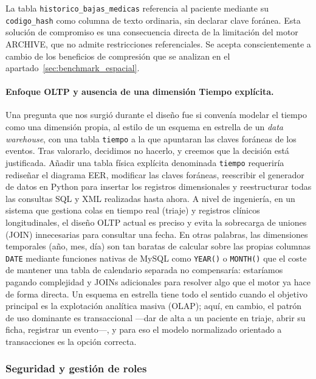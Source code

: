 \documentclass[../main.tex]{subfiles}
\begin{document}
La tabla \texttt{historico\_bajas\_medicas} referencia al paciente mediante su \texttt{codigo\_hash} como columna de texto ordinaria, sin declarar clave foránea. Esta solución de compromiso es una consecuencia directa de la limitación del motor ARCHIVE, que no admite restricciones referenciales. Se acepta conscientemente a cambio de los beneficios de compresión que se analizan en el apartado~\ref{sec:benchmark_espacial}.

\paragraph{Enfoque OLTP y ausencia de una dimensión Tiempo explícita.}

Una pregunta que nos surgió durante el diseño fue si convenía modelar el tiempo como una dimensión propia, al estilo de un esquema en estrella de un \textit{data warehouse}, con una tabla \texttt{tiempo} a la que apuntaran las claves foráneas de los eventos. Tras valorarlo, decidimos no hacerlo, y creemos que la decisión está justificada. Añadir una tabla física explícita denominada \texttt{tiempo} requeriría rediseñar el diagrama EER, modificar las claves foráneas, reescribir el generador de datos en Python para insertar los registros dimensionales y reestructurar todas las consultas SQL y XML realizadas hasta ahora. A nivel de ingeniería, en un sistema que gestiona colas en tiempo real (triaje) y registros clínicos longitudinales, el diseño OLTP actual es preciso y evita la sobrecarga de uniones (JOIN) innecesarias para consultar una fecha. En otras palabras, las dimensiones temporales (año, mes, día) son tan baratas de calcular sobre las propias columnas \texttt{DATE} mediante funciones nativas de MySQL como \texttt{YEAR()} o \texttt{MONTH()} que el coste de mantener una tabla de calendario separada no compensaría: estaríamos pagando complejidad y JOINs adicionales para resolver algo que el motor ya hace de forma directa. Un esquema en estrella tiene todo el sentido cuando el objetivo principal es la explotación analítica masiva (OLAP); aquí, en cambio, el patrón de uso dominante es transaccional —dar de alta a un paciente en triaje, abrir su ficha, registrar un evento—, y para eso el modelo normalizado orientado a transacciones es la opción correcta.

\subsubsection{Seguridad y gestión de roles}
\end{document}
